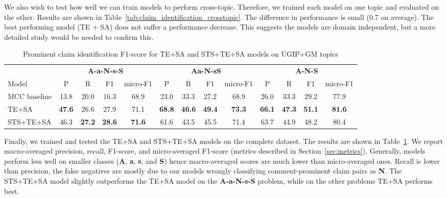 We also wish to test how well we can train models to perform cross-topic. 
Therefore, we trained each model on one topic and evaluated on the other. 
Results are shown in Table~\ref{tab:claim_identification_crosstopic}. 
The difference in performance is small (0.7 on average). 
The best performing model (TE + SA) does not suffer a performance decrease. 
This suggests the models are domain independent, but a more detailed study would be
needed to confirm this.

\begin{table}
\setlength{\tabcolsep}{5pt}
\centering
{\small
\begin{tabular}{l cccc cccc cccc}
\toprule
& \multicolumn{4}{c}{\textbf{A-a-N-s-S}} & \multicolumn{4}{c}{\textbf{Aa-N-sS}} & 
\multicolumn{4}{c}{\textbf{A-N-S}}\\
\cmidrule(lr){2-5}
\cmidrule(lr){6-9}
\cmidrule(lr){10-13}
Model
& P & R & F1 & micro-F1 & P & R & F1 & micro-F1 & P & R & F1 & micro-F1 \\
\midrule
MCC baseline & 13.8 & 20.0 & 16.3 & 68.9 & 23.0 & 33.3 & 27.2 & 68.9 & 26.0 & 33.3 & 29.2 & 77.9\\
TE+SA & \textbf{47.6} & 26.6 & 27.9 & 71.1 & \textbf{68.8} & \textbf{46.6} & \textbf{49.4} & \textbf{73.3} & \textbf{66.1} & \textbf{47.3} & \textbf{51.1} & \textbf{81.6} \\
STS+TE+SA & 46.3 & \textbf{27.2} & \textbf{28.6} & \textbf{71.6} & 61.6 & 43.5 & 45.5 & 71.4  & 63.7 & 44.9 & 48.2 & 80.4 \\
\bottomrule
\end{tabular}}
\caption{Prominent claim identification F1-score for TE+SA and STS+TE+SA models on UGIP+GM topics}
\label{tab:claim_identification_best}
\end{table}

Finally, we trained and tested the TE+SA and STS+TE+SA models on the complete 
\ComArg dataset. 
The results are shown in Table~\ref{tab:claim_identification_best}. 
We report macro-averaged precision, recall, F1-score, and 
micro-averaged F1-score (metrics described in Section~\ref{sec:metrics}). 
Generally, models perform less well on smaller classes (\textbf{A},
\textbf{a}, \textbf{s}, and \textbf{S}) hence macro-averaged scores are much lower than
micro-averaged ones. 
Recall is lower than precision, the false negatives are mostly due to our models
wrongly classifying comment-prominent claim pairs as \textbf{N}. 
The STS+TE+SA model slightly outperforms the TE+SA model on the \textbf{A-a-N-s-S} problem,
while on the other problems TE+SA performs best. 

